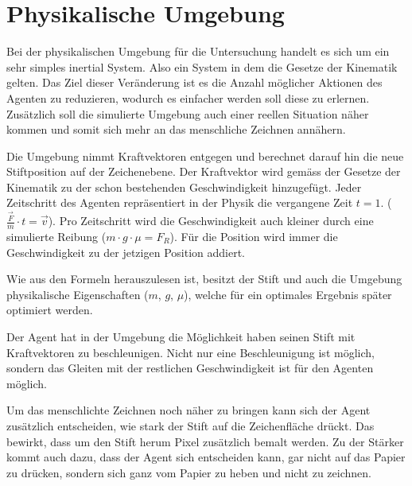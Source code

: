 
    


\section{Physikalische Umgebung}
Bei der physikalischen Umgebung für die Untersuchung handelt es sich um ein sehr
simples inertial System. Also ein System in dem die Gesetze der Kinematik
gelten. Das Ziel dieser Veränderung ist es die Anzahl möglicher Aktionen des
Agenten zu reduzieren, wodurch es einfacher werden soll diese zu erlernen.
Zusätzlich soll die simulierte Umgebung auch einer reellen Situation näher
kommen und somit sich mehr an das menschliche Zeichnen annähern.

Die Umgebung nimmt Kraftvektoren entgegen und berechnet darauf hin die neue
Stiftposition auf der Zeichenebene. Der Kraftvektor wird gemäss der Gesetze der
Kinematik zu der schon bestehenden Geschwindigkeit hinzugefügt. Jeder
Zeitschritt des Agenten repräsentiert in der Physik die vergangene Zeit $t=1$.
($\frac{\vec{F}}{m}\cdot t=\vec{v}$). Pro Zeitschritt wird die Geschwindigkeit
auch kleiner durch eine simulierte Reibung ($m\cdot g \cdot \mu = F_R$). Für die
Position wird immer die Geschwindigkeit zu der jetzigen Position addiert.

Wie aus den Formeln herauszulesen ist, besitzt der Stift und auch die Umgebung
physikalische Eigenschaften ($m$, $g$, $\mu$), welche für ein optimales Ergebnis
später optimiert werden.

Der Agent hat in der Umgebung die Möglichkeit haben seinen Stift mit
Kraftvektoren zu beschleunigen. Nicht nur eine Beschleunigung ist möglich,
sondern das Gleiten mit der restlichen Geschwindigkeit ist für den Agenten
möglich.

Um das menschlichte Zeichnen noch näher zu bringen kann sich der Agent
zusätzlich entscheiden, wie stark der Stift auf die Zeichenfläche drückt. Das
bewirkt, dass um den Stift herum Pixel zusätzlich bemalt werden. Zu der Stärker
kommt auch dazu, dass der Agent sich entscheiden kann, gar nicht auf das Papier
zu drücken, sondern sich ganz vom Papier zu heben und nicht zu zeichnen.

